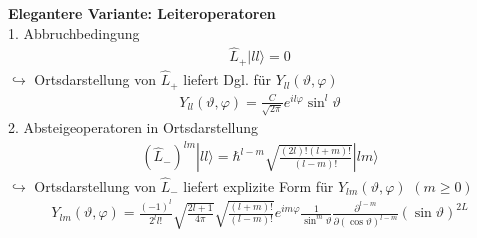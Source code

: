 \documentclass[10pt,article,colorback,accentcolor=tud9d]{scrartcl}
\begin{document}
\textbf{Elegantere Variante: Leiteroperatoren}\\
1. Abbruchbedingung
  \begin{align}
  \hat{L}_+|ll\rangle=0
  \end{align}
  $\hookrightarrow$ Ortsdarstellung von $\hat{L}_+$ liefert Dgl. für $Y_{ll}(\vartheta,\varphi)$
  \begin{align}
  Y_{ll}(\vartheta,\varphi)=\frac{C}{\sqrt{2\pi}}e^{il\varphi}\sin^l\vartheta
  \end{align}
  2. Absteigeoperatoren in Ortsdarstellung
  \begin{align}
  (\hat{L}_-)^{lm}|ll\rangle=\hbar^{l-m}\sqrt{\frac{(2l)!(l+m)!}{(l-m)!}}|lm\rangle
  \end{align}
  $\hookrightarrow$ Ortsdarstellung von $\hat{L}_-$ liefert explizite Form für $Y_{lm}(\vartheta,\varphi)$  $(m\geq0)$
  \begin{align}
  Y_{lm}(\vartheta,\varphi)=\frac{(-1)^l}{2^ll!}\sqrt{\frac{2l+1}{4\pi}}\sqrt{\frac{(l+m)!}{(l-m)!}}e^{im\varphi}\frac{1}{\sin^m\vartheta}\frac{\partial^{l-m}}{\partial(\cos\vartheta)^{l-m}}(\sin\vartheta)^{2L}
  \end{align}
  
  
\end{document}
